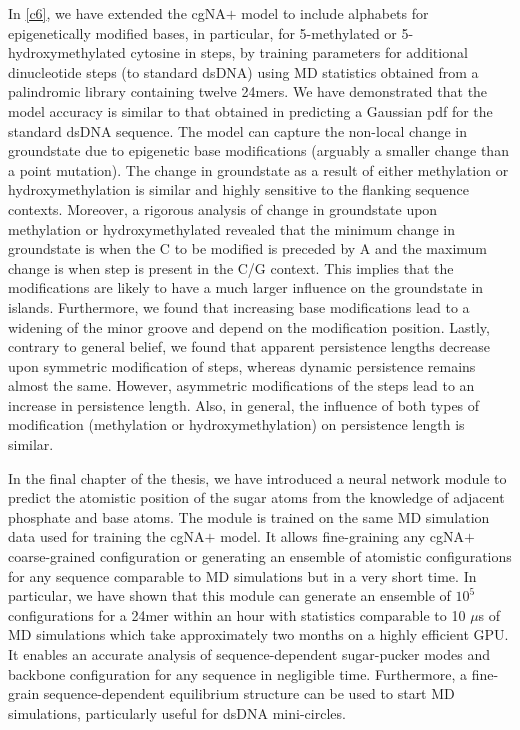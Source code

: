 In \cref{c6}, we have extended the cgNA$+$ model to include alphabets for epigenetically modified bases, in particular, for 5-methylated or 5-hydroxymethylated cytosine in \cpg steps, by training parameters for additional dinucleotide steps (to standard dsDNA) using MD statistics obtained from a palindromic library containing twelve 24mers.
We have demonstrated that the model accuracy is similar to that obtained in predicting a Gaussian pdf for the standard dsDNA sequence. 
The model can capture the non-local change in groundstate due to epigenetic base modifications (arguably a smaller change than a point mutation).
The change in groundstate as a result of either methylation or hydroxymethylation is similar and highly sensitive to the flanking sequence contexts. 
Moreover, a rigorous analysis of change in groundstate upon methylation or hydroxymethylated revealed that the minimum change in groundstate is when the C to be modified is preceded by A and the maximum change is when \cpg step is present in the C/G context. 
This implies that the \cpg modifications are likely to have a much larger influence on the groundstate in \cpg islands.
Furthermore, we found that increasing base modifications lead to a widening of the minor groove and depend on the modification position.
Lastly, contrary to general belief, we found that apparent persistence lengths decrease upon symmetric modification of \cpg steps, whereas dynamic persistence remains almost the same.
However, asymmetric modifications of the \cpg steps lead to an increase in persistence length. 
Also, in general, the influence of both types of modification (methylation or hydroxymethylation) on persistence length is similar.

In the final chapter of the thesis, we have introduced a neural network module to predict the atomistic position of the sugar atoms from the knowledge of adjacent phosphate and base atoms. 
The module is trained on the same MD simulation data used for training the cgNA$+$ model.
It allows fine-graining any cgNA$+$ coarse-grained configuration or generating an ensemble of atomistic configurations for any sequence comparable to MD simulations but in a very short time.
In particular, we have shown that this module can generate an ensemble of $10^5$ configurations for a 24mer within an hour with statistics comparable to 10 $\mu$s of MD simulations which take approximately two months on a highly efficient GPU.
It enables an accurate analysis of sequence-dependent sugar-pucker modes and backbone configuration for any sequence in negligible time.
Furthermore, a fine-grain sequence-dependent equilibrium structure can be used to start MD simulations, particularly useful for dsDNA mini-circles.

